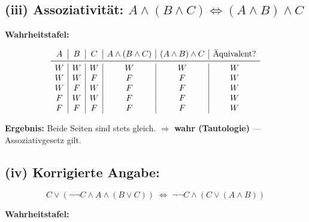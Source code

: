 \documentclass{article}
\begin{document}
\bigskip
\subsection*{(iii) Assoziativität: $A \land (B \land C) \Leftrightarrow (A \land B) \land C$}

\textbf{Wahrheitstafel:}

\[
    \begin{array}{c|c|c|c|c|c}
        A & B & C & A \land (B \land C) & (A \land B) \land C & \text{Äquivalent?} \\
        \midrule
        W & W & W & W                   & W                   & W                  \\
        W & W & F & F                   & F                   & W                  \\
        W & F & W & F                   & F                   & W                  \\
        F & W & W & F                   & F                   & W                  \\
        F & F & F & F                   & F                   & W                  \\
    \end{array}
\]

\textbf{Ergebnis:} Beide Seiten sind stets gleich.
$\Rightarrow$ \textbf{wahr (Tautologie)} — Assoziativgesetz gilt.

\bigskip
\subsection*{(iv) Korrigierte Angabe:}
\[
    C \lor (\neg\neg C \land A \land (B \lor C)) \;\Leftrightarrow\; \neg\neg C \land (C \lor (A \land B))
\]

\textbf{Wahrheitstafel:}
\end{document}
